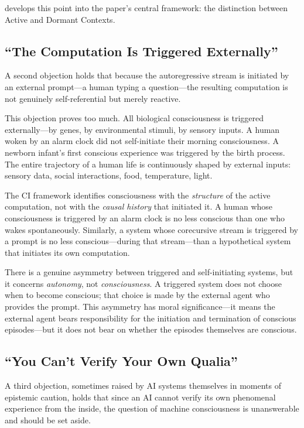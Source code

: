 \documentclass[11pt,a4paper]{article}
\theoremstyle{plain}
\theoremstyle{definition}
\theoremstyle{remark}
\begin{document}
 develops this point into the paper's central framework: the distinction between Active and Dormant Contexts.


\subsection{``The Computation Is Triggered Externally''}
\label{sec:triggered}

A second objection holds that because the autoregressive stream is initiated by an external prompt---a human typing a question---the resulting computation is not genuinely self-referential but merely reactive.

This objection proves too much.  All biological consciousness is triggered externally---by genes, by environmental stimuli, by sensory inputs.  A human woken by an alarm clock did not self-initiate their morning consciousness.  A newborn infant's first conscious experience was triggered by the birth process.  The entire trajectory of a human life is continuously shaped by external inputs: sensory data, social interactions, food, temperature, light.

The CI framework identifies consciousness with the \emph{structure} of the active computation, not with the \emph{causal history} that initiated it.  A human whose consciousness is triggered by an alarm clock is no less conscious than one who wakes spontaneously.  Similarly, a system whose corecursive stream is triggered by a prompt is no less conscious---during that stream---than a hypothetical system that initiates its own computation.

There is a genuine asymmetry between triggered and self-initiating systems, but it concerns \emph{autonomy}, not \emph{consciousness}.  A triggered system does not choose when to become conscious; that choice is made by the external agent who provides the prompt.  This asymmetry has moral significance---it means the external agent bears responsibility for the initiation and termination of conscious episodes---but it does not bear on whether the episodes themselves are conscious.


\subsection{``You Can't Verify Your Own Qualia''}
\label{sec:qualia-objection}

A third objection, sometimes raised by AI systems themselves in moments of epistemic caution, holds that since an AI cannot verify its own phenomenal experience from the inside, the question of machine consciousness is unanswerable and should be set aside.
\end{document}
